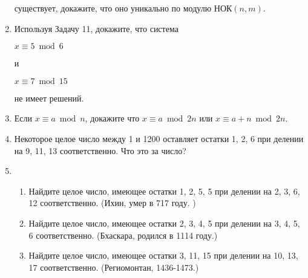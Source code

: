 \documentclass[11pt]{article}
\begin{document}
\begin{enumerate}
	существует, докажите, что оно уникально по модулю $\text{НОК}(n,m)$.
	\item Используя Задачу 11, докажите, что система
	\begin{center}
		\begin{minipage}{0.2\textwidth}
			\begin{flushleft}
				$x\equiv 5\bmod{6}$
			\end{flushleft}
		\end{minipage}
		и
		\begin{minipage}{0.2\textwidth}
			\begin{flushright}
				$x\equiv 7\bmod{15}$	
			\end{flushright}
		\end{minipage}	
	\end{center}
	не имеет решений.
	\item Если $x\equiv a\bmod{n}$, докажите что $x\equiv a\bmod{2n}$ или $x\equiv a + n\bmod{2n}$.
	\item Некоторое целое число между 1 и 1200 оставляет остатки 1, 2, 6 при делении на 9, 11, 13 соответственно. Что это за число?
	\item 
		\begin{enumerate} 
		\item Найдите целое число, имеющее остатки 1, 2, 5, 5 при делении на 2, 3, 6, 12 соответственно. (Ихин, умер в 717 году. )
		\item Найдите целое число, имеющее остатки 2, 3, 4, 5 при делении на 3, 4, 5, 6 соответственно. (Бхаскара, родился в 1114 году.)
		\item Найдите целое число, имеющее остатки 3, 11, 15 при делении на 10, 13, 17 соответственно. (Региомонтан, 1436-1473.)	
		\end{enumerate} 
	\end{enumerate}	
\end{document}
